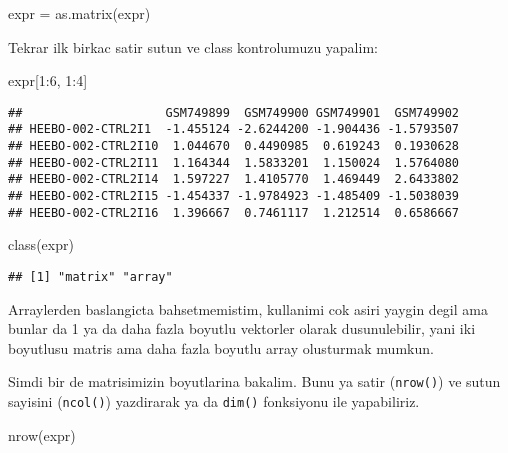 \documentclass[
]{book}
\newenvironment{Shaded}{\begin{snugshade}}{\end{snugshade}}
\newcommand{\DecValTok}[1]{\textcolor[rgb]{0.00,0.00,0.81}{#1}}
\newcommand{\FunctionTok}[1]{\textcolor[rgb]{0.00,0.00,0.00}{#1}}
\newcommand{\NormalTok}[1]{#1}
\newcommand{\OtherTok}[1]{\textcolor[rgb]{0.56,0.35,0.01}{#1}}
\newcommand{\SpecialCharTok}[1]{\textcolor[rgb]{0.00,0.00,0.00}{#1}}
\begin{document}
\begin{Shaded}
\begin{Highlighting}[]
\NormalTok{expr }\OtherTok{=} \FunctionTok{as.matrix}\NormalTok{(expr)}
\end{Highlighting}
\end{Shaded}

Tekrar ilk birkac satir sutun ve class kontrolumuzu yapalim:

\begin{Shaded}
\begin{Highlighting}[]
\NormalTok{expr[}\DecValTok{1}\SpecialCharTok{:}\DecValTok{6}\NormalTok{, }\DecValTok{1}\SpecialCharTok{:}\DecValTok{4}\NormalTok{]}
\end{Highlighting}
\end{Shaded}

\begin{verbatim}
##                    GSM749899  GSM749900 GSM749901  GSM749902
## HEEBO-002-CTRL2I1  -1.455124 -2.6244200 -1.904436 -1.5793507
## HEEBO-002-CTRL2I10  1.044670  0.4490985  0.619243  0.1930628
## HEEBO-002-CTRL2I11  1.164344  1.5833201  1.150024  1.5764080
## HEEBO-002-CTRL2I14  1.597227  1.4105770  1.469449  2.6433802
## HEEBO-002-CTRL2I15 -1.454337 -1.9784923 -1.485409 -1.5038039
## HEEBO-002-CTRL2I16  1.396667  0.7461117  1.212514  0.6586667
\end{verbatim}

\begin{Shaded}
\begin{Highlighting}[]
\FunctionTok{class}\NormalTok{(expr)}
\end{Highlighting}
\end{Shaded}

\begin{verbatim}
## [1] "matrix" "array"
\end{verbatim}

Arraylerden baslangicta bahsetmemistim, kullanimi cok asiri yaygin degil ama bunlar da 1 ya da daha fazla boyutlu vektorler olarak dusunulebilir, yani iki boyutlusu matris ama daha fazla boyutlu array olusturmak mumkun.

Simdi bir de matrisimizin boyutlarina bakalim. Bunu ya satir (\texttt{nrow()}) ve sutun sayisini (\texttt{ncol()}) yazdirarak ya da \texttt{dim()} fonksiyonu ile yapabiliriz.

\begin{Shaded}
\begin{Highlighting}[]
\FunctionTok{nrow}\NormalTok{(expr)}
\end{Highlighting}
\end{Shaded}
\end{document}
